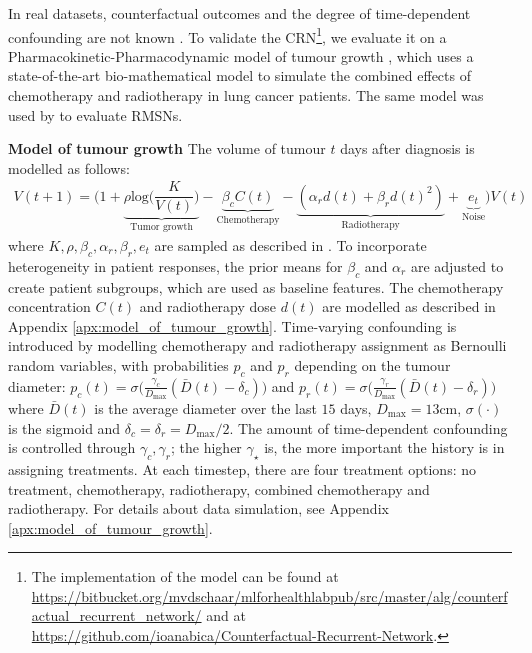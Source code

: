 \documentclass{article} %
\begin{document}
	In real datasets, counterfactual outcomes and the degree of time-dependent confounding are not known \citep{schulam2017reliable, lim2018forecasting}. To validate the CRN\footnote{The implementation of the model can be found at \url{https://bitbucket.org/mvdschaar/mlforhealthlabpub/src/master/alg/counterfactual_recurrent_network/} and at \url{https://github.com/ioanabica/Counterfactual-Recurrent-Network}.}, we evaluate it on a  Pharmacokinetic-Pharmacodynamic model of tumour growth \citep{geng2017prediction}, which uses a state-of-the-art bio-mathematical model to simulate the combined effects of chemotherapy and radiotherapy in lung cancer patients.  The same model was used by \citet{lim2018forecasting} to evaluate RMSNs. 


 	\textbf{Model of tumour growth} The volume of tumour $t$ days after diagnosis is modelled as follows:
	\begin{equation}
	\begin{aligned}
	V(t+1) =  \Big( 1 + \underbrace{\rho \text{log}\big(\dfrac{K}{V(t)}\big)}_{\text{Tumor growth}} - \underbrace{\beta_c C(t)}_{\text{Chemotherapy}} - \underbrace{\left(\alpha_r d(t) + \beta_r d(t)^2\right)}_{\text{Radiotherapy}} + \underbrace{e_t}_{\text{Noise}}  \Big)V(t) 
	\end{aligned}
	\end{equation}
	where $K, \rho, \beta_c, \alpha_r, \beta_r, e_t$ are sampled as described in \cite{geng2017prediction}. To incorporate heterogeneity in patient responses, the prior means for $\beta_c$ and  $\alpha_r$ are adjusted to create patient subgroups, which are used as baseline features. The chemotherapy  concentration $C(t)$ and radiotherapy dose $d(t)$ are modelled as described in Appendix \ref{apx:model_of_tumour_growth}. Time-varying confounding is introduced by modelling  chemotherapy and radiotherapy assignment as Bernoulli random variables, with probabilities $p_c$ and $p_r$ depending on the tumour diameter: $p_c(t) = \sigma \big(\frac{\gamma_c}{D_{\max}} (\bar{D}(t) - \delta_c )  \big)$ and $p_r(t) = \sigma \big(\frac{\gamma_r}{D_{\max}} (\bar{D}(t) - \delta_r ) \big)$
	where $\bar{D}(t)$ is the average diameter over the last $15$ days, $D_{\max} = 13 \text{cm}$, $\sigma(\cdot)$ is the sigmoid and $\delta_c = \delta_r = D_{\max}/2$.   The amount of time-dependent confounding is controlled through $\gamma_c, \gamma_r$; the higher $\gamma_{\star}$ is, the more important the history is in assigning treatments. At each timestep, there are four treatment options: no treatment,  chemotherapy,  radiotherapy, combined chemotherapy and radiotherapy. For details about data simulation, see Appendix \ref{apx:model_of_tumour_growth}.
	
\end{document}
